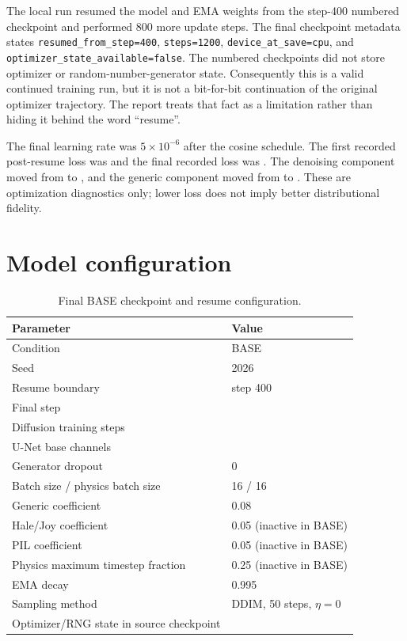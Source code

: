 \documentclass[11pt,oneside]{report}
\begin{document}
The local run resumed the model and EMA weights from the step-400 numbered checkpoint and performed 800 more update steps. The final checkpoint metadata states \texttt{resumed\_from\_step=400}, \texttt{steps=1200}, \texttt{device\_at\_save=cpu}, and \texttt{optimizer\_state\_available=false}. The numbered checkpoints did not store optimizer or random-number-generator state. Consequently this is a valid continued training run, but it is not a bit-for-bit continuation of the original optimizer trajectory. The report treats that fact as a limitation rather than hiding it behind the word ``resume''.

The final learning rate was $5\times10^{-6}$ after the cosine schedule. The first recorded post-resume loss was \StartLoss{} and the final recorded loss was \EndLoss{}. The denoising component moved from \StartDenoise{} to \EndDenoise{}, and the generic component moved from \StartGeneric{} to \EndGeneric{}. These are optimization diagnostics only; lower loss does not imply better distributional fidelity.

\section{Model configuration}

\begin{table}[H]
\centering
\caption{Final BASE checkpoint and resume configuration.}
\label{tab:config}
\begin{tabular}{ll}
\toprule
Parameter & Value \\
\midrule
Condition & BASE \\
Seed & 2026 \\
Resume boundary & step 400 \\
Final step & \BaseSteps{} \\
Diffusion training steps & \DiffusionSteps{} \\
U-Net base channels & \BaseChannels{} \\
Generator dropout & 0 \\
Batch size / physics batch size & 16 / 16 \\
Generic coefficient & 0.08 \\
Hale/Joy coefficient & 0.05 (inactive in BASE) \\
PIL coefficient & 0.05 (inactive in BASE) \\
Physics maximum timestep fraction & 0.25 (inactive in BASE) \\
EMA decay & 0.995 \\
Sampling method & DDIM, 50 steps, $\eta=0$ \\
Optimizer/RNG state in source checkpoint & \CheckpointOptimizer{} \\
\bottomrule
\end{tabular}
\end{table}
\end{document}
